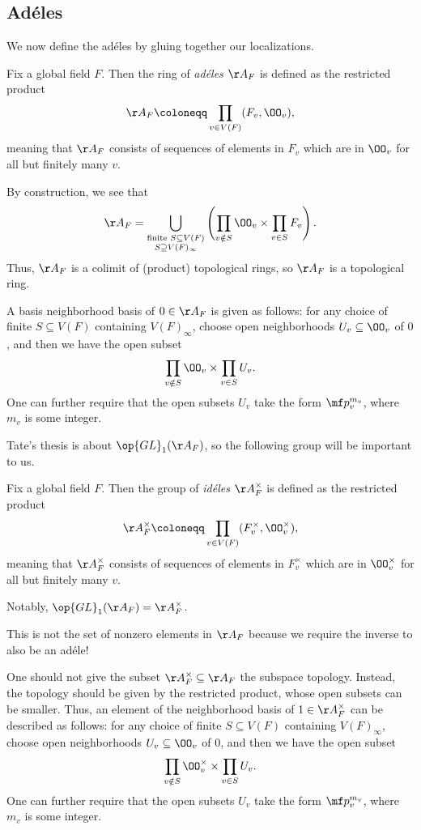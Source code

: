 \documentclass[../notes.tex]{subfiles}
\begin{document}
\subsection{Ad\'eles}
We now define the ad\'eles by gluing together our localizations.
\begin{definition}[ad\'eles]
	Fix a global field $F$. Then the ring of \textit{ad\'eles} $\AA_F$ is defined as the restricted product
	\[\AA_F\coloneqq\prod_{v\in V(F)}(F_v,\OO_v),\]
	meaning that $\AA_F$ consists of sequences of elements in $F_v$ which are in $\OO_v$ for all but finitely many $v$.
\end{definition}
\begin{remark}
	By construction, we see that
	\[\AA_F=\bigcup_{\substack{\text{finite }S\subseteq V(F)\\S\supseteq V(F)_\infty}}\left(\prod_{v\notin S}\OO_v\times\prod_{v\in S}F_v\right).\]
	Thus, $\AA_F$ is a colimit of (product) topological rings, so $\AA_F$ is a topological ring.
\end{remark}
\begin{remark}
	A basis neighborhood basis of $0\in\AA_F$ is given as follows: for any choice of finite $S\subseteq V(F)$ containing $V(F)_\infty$, choose open neighborhoods $U_v\subseteq\OO_v$ of $0$, and then we have the open subset
	\[\prod_{v\notin S}\OO_v\times\prod_{v\in S}U_v.\]
	One can further require that the open subsets $U_v$ take the form $\mf p_v^{m_v}$, where $m_v$ is some integer.
\end{remark}
Tate's thesis is about $\op{GL}_1(\AA_F)$, so the following group will be important to us.
\begin{definition}
	Fix a global field $F$. Then the group of \textit{id\'eles} $\AA_F^\times$ is defined as the restricted product
	\[\AA_F^\times\coloneqq\prod_{v\in V(F)}(F_v^\times,\OO_v^\times),\]
	meaning that $\AA_F^\times$ consists of sequences of elements in $F_v^\times$ which are in $\OO_v^\times$ for all but finitely many $v$.
\end{definition}
Notably, $\op{GL}_1(\AA_F)=\AA_F^\times$.
\begin{remark}
	This is not the set of nonzero elements in $\AA_F$ because we require the inverse to also be an ad\'ele!
\end{remark}
\begin{remark}
	One should not give the subset $\AA_F^\times\subseteq\AA_F$ the subspace topology. Instead, the topology should be given by the restricted product, whose open subsets can be smaller. Thus, an element of the neighborhood basis of $1\in\AA_F^\times$ can be described as follows: for any choice of finite $S\subseteq V(F)$ containing $V(F)_\infty$, choose open neighborhoods $U_v\subseteq\OO_v$ of $0$, and then we have the open subset
	\[\prod_{v\notin S}\OO_v^\times\times\prod_{v\in S}U_v.\]
	One can further require that the open subsets $U_v$ take the form $\mf p_v^{m_v}$, where $m_v$ is some integer.
\end{remark}
\end{document}
